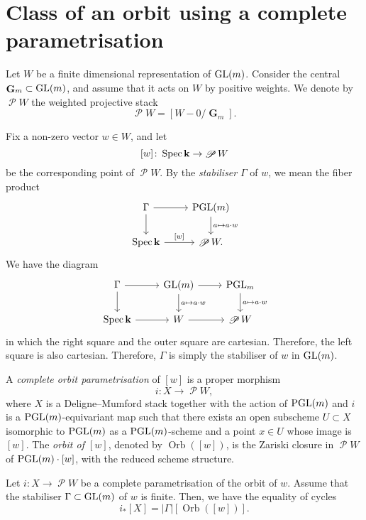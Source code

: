 \documentclass{amsart}
\renewcommand{\k}{\mathbf k}
\DeclareMathOperator{\G}{\mathbf G}
\DeclareMathOperator{\Orb}{Orb}
\DeclareMathOperator{\sP}{\mathscr P}
\begin{document}
\section{Class of an orbit using a complete parametrisation}\label{sec:param}
Let \(W\) be a finite dimensional representation of \(\operatorname{GL}({m})\).
Consider the central \(\G_{m} \subset \GL({m})\), and assume that it acts on \(W\) by positive weights.
We denote by \(\sP W\) the weighted projective stack
\[ \sP W = [W - 0 \big / \G_{m}].\]

Fix a non-zero vector \(w \in W\), and let
\[ [w] \colon \spec \k \to \sP W\]
be the corresponding point of \(\sP W\).
By the \emph{stabiliser} \(\Gamma\) of \(w\), we mean the fiber product
\begin{equation}\label{eq:stab}
\begin{tikzcd}
  \Gamma \ar{r}\ar{d} & \PGL(m)  \ar{d}{a \mapsto a\cdot w} \\
  \spec \k \ar{r}{[w]} & \sP W.
\end{tikzcd}
\end{equation}
We have the diagram
\[
  \begin{tikzcd}
     \Gamma\ar{d}\ar{r}  &\GL(m) \ar{r}\ar{d}{a \mapsto a\cdot w}&\PGL_m\ar{d}{a \mapsto a \cdot w}\\
    \spec \k \ar{r} & W \ar{r} & \sP W 
  \end{tikzcd}
\]
in which the right square and the outer square are cartesian.
Therefore, the left square is also cartesian.
Therefore, \(\Gamma\) is simply the stabiliser of \(w\) in \(\operatorname{GL}(m)\).

A \emph{complete orbit parametrisation} of \([w]\) is a proper morphism
\[ i \colon X \to \sP W,\]
where \(X\) is a Deligne--Mumford stack together with the action of \(\operatorname{PGL}(m)\) and \(i\) is a \(\operatorname{PGL}(m)\)-equivariant map such that there exists an open subscheme \(U \subset X\) isomorphic to \(\operatorname{PGL}(m)\) as a \(\operatorname{PGL}(m)\)-scheme and a point \(x \in U\) whose image is \([w]\).
The \emph{orbit of \([w]\)}, denoted by \(\Orb([w])\), is the Zariski closure in \(\sP W\) of \(\operatorname{PGL}(m) \cdot [w]\), with the reduced scheme structure.
\begin{proposition}\label{prop:weighted-complete-param}
  Let \(i \colon X \to \sP W\) be a complete parametrisation of the orbit of \(w\).
  Assume that the stabiliser \(\Gamma \subset \operatorname{GL}(m)\) of \(w\) is finite.
  Then, we have the equality of cycles
  \[ i_{*}[X] = |\Gamma| [\Orb([w])].\]
\end{proposition}
\end{document}
